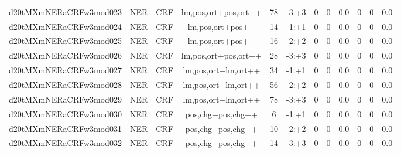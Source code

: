 \documentclass[a4paper]{article}
\begin{document}
\begin{landscape}
\begin{center}
\begin{tabular}{ |c|c|c|c|c|c|c|c|c|c|c|c|}
 
 	
 	\small{ d20tMXmNERaCRFw3mod023 } & \small{ NER} & \small{  CRF }  & lm,pos,ort+pos,ort++  &  78 &  \small{  -3:+3 }  &  0 & 0 & 0.0  &  0 & 0 & 0.0 \\
 	

 
 	
 	\small{ d20tMXmNERaCRFw3mod024 } & \small{ NER} & \small{  CRF }  & lm,pos,ort+pos++  &  14 &  \small{  -1:+1 }  &  0 & 0 & 0.0  &  0 & 0 & 0.0 \\
 	

 
 	
 	\small{ d20tMXmNERaCRFw3mod025 } & \small{ NER} & \small{  CRF }  & lm,pos,ort+pos++  &  16 &  \small{  -2:+2 }  &  0 & 0 & 0.0  &  0 & 0 & 0.0 \\
 	

 
 	
 	\small{ d20tMXmNERaCRFw3mod026 } & \small{ NER} & \small{  CRF }  & lm,pos,ort+pos,ort++  &  28 &  \small{  -3:+3 }  &  0 & 0 & 0.0  &  0 & 0 & 0.0 \\
 	

 
 	
 	\small{ d20tMXmNERaCRFw3mod027 } & \small{ NER} & \small{  CRF }  & lm,pos,ort+lm,ort++  &  34 &  \small{  -1:+1 }  &  0 & 0 & 0.0  &  0 & 0 & 0.0 \\
 	

 
 	
 	\small{ d20tMXmNERaCRFw3mod028 } & \small{ NER} & \small{  CRF }  & lm,pos,ort+lm,ort++  &  56 &  \small{  -2:+2 }  &  0 & 0 & 0.0  &  0 & 0 & 0.0 \\
 	

 
 	
 	\small{ d20tMXmNERaCRFw3mod029 } & \small{ NER} & \small{  CRF }  & lm,pos,ort+lm,ort++  &  78 &  \small{  -3:+3 }  &  0 & 0 & 0.0  &  0 & 0 & 0.0 \\
 	

 
 	
 	\small{ d20tMXmNERaCRFw3mod030 } & \small{ NER} & \small{  CRF }  & pos,chg+pos,chg++  &  6 &  \small{  -1:+1 }  &  0 & 0 & 0.0  &  0 & 0 & 0.0 \\
 	

 
 	
 	\small{ d20tMXmNERaCRFw3mod031 } & \small{ NER} & \small{  CRF }  & pos,chg+pos,chg++  &  10 &  \small{  -2:+2 }  &  0 & 0 & 0.0  &  0 & 0 & 0.0 \\
 	

 
 	
 	\small{ d20tMXmNERaCRFw3mod032 } & \small{ NER} & \small{  CRF }  & pos,chg+pos,chg++  &  14 &  \small{  -3:+3 }  &  0 & 0 & 0.0  &  0 & 0 & 0.0 \\
 	


\end{tabular}
\end{center}
\end{landscape}
\end{document}
